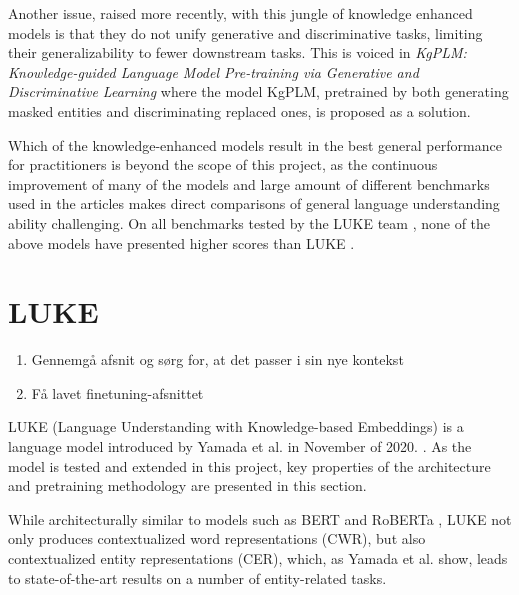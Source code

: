 \documentclass[main.tex]{subfiles}
\begin{document}
Another issue, raised more recently, with this jungle of knowledge enhanced models is that they do not unify generative and discriminative tasks, limiting their generalizability to fewer downstream tasks.
This is voiced in \emph{KgPLM: Knowledge-guided Language Model Pre-training via Generative and Discriminative Learning} \cite{he2020kgplm} where the model KgPLM, pretrained by both generating masked entities and discriminating replaced ones, is proposed as a solution.

Which of the knowledge-enhanced models result in the best general performance for practitioners is beyond the scope of this project, as the continuous improvement of many of the models and large amount of different benchmarks used in the articles makes direct comparisons of general language understanding ability challenging.
On all benchmarks tested by the LUKE team \cite{yamada2020luke}, none of the above models have presented higher scores than LUKE \cite[Sec. 4]{yamada2020luke}.


\section{LUKE}
\begin{enumerate}
    \item Gennemgå afsnit og sørg for, at det passer i sin nye kontekst
    \item Få lavet finetuning-afsnittet
\end{enumerate}
LUKE (Language Understanding with Knowledge-based Embeddings) is a language model introduced by Yamada et al. in November of 2020. \cite{yamada2020luke}.
As the model is tested and extended in this project, key properties of the architecture and pretraining methodology are presented in this section.

While architecturally similar to models such as BERT \cite{devlin2019bert} and RoBERTa \cite{liu2019roberta}, LUKE not only produces contextualized word representations (CWR), but also contextualized entity representations (CER), which, as Yamada et al. show, leads to state-of-the-art results on a number of entity-related tasks.
\end{document}
